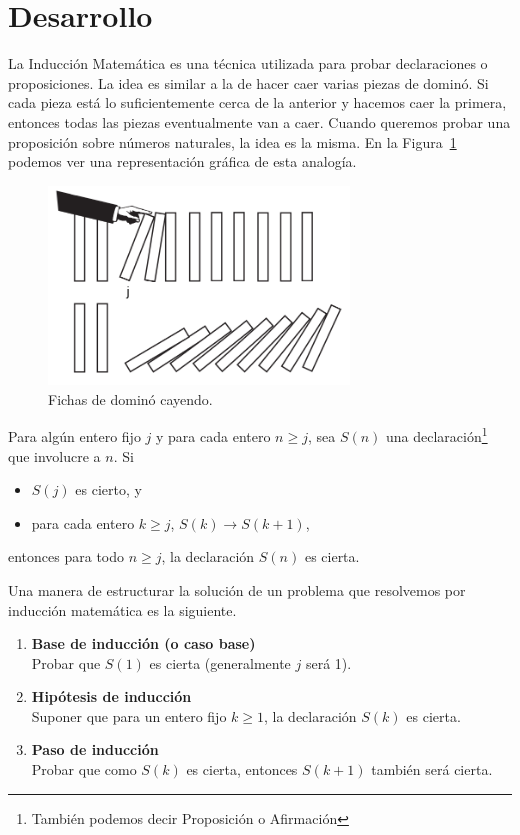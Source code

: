 \section{Desarrollo}

La Inducción Matemática es una técnica utilizada para probar declaraciones o proposiciones.
La idea es similar a la de hacer caer varias piezas de dominó.
Si cada pieza está lo suficientemente cerca de la anterior y hacemos caer la primera, entonces todas las piezas eventualmente van a caer.
Cuando queremos probar una proposición sobre números naturales, la idea es la misma.
En la Figura~\ref{fig:figure} podemos ver una representación gráfica de esta analogía.

\begin{figure}[htb]
    \centering
    \includegraphics[width=8cm]{images/dominoes-fall}
    \caption{Fichas de dominó cayendo.}
    \label{fig:figure}
\end{figure}

\begin{theorem}
    Para algún entero fijo $j$ y para cada entero $n \geq j$, sea $S(n)$ una declaración\footnote{También podemos decir Proposición o Afirmación} que involucre a $n$. Si
    \begin{itemize}
        \item $S(j)$ es cierto, y
        \item para cada entero $k \geq j$, $S(k) \rightarrow S(k + 1)$,
    \end{itemize}
    entonces para todo $n \geq j$, la declaración $S(n)$ es cierta.
\end{theorem}

Una manera de estructurar la solución de un problema que resolvemos por inducción matemática es la siguiente.
\begin{enumerate}[label={\arabic*.}]
    \item \textbf{Base de inducción (o caso base)}\\
    Probar que $S(1)$ es cierta (generalmente $j$ será 1).

    \item \textbf{Hipótesis de inducción}\\
    Suponer que para un entero fijo $k \geq 1$, la declaración $S(k)$ es cierta.

    \item \textbf{Paso de inducción}\\
    Probar que como $S(k)$ es cierta, entonces $S(k + 1)$ también será cierta.
\end{enumerate}

